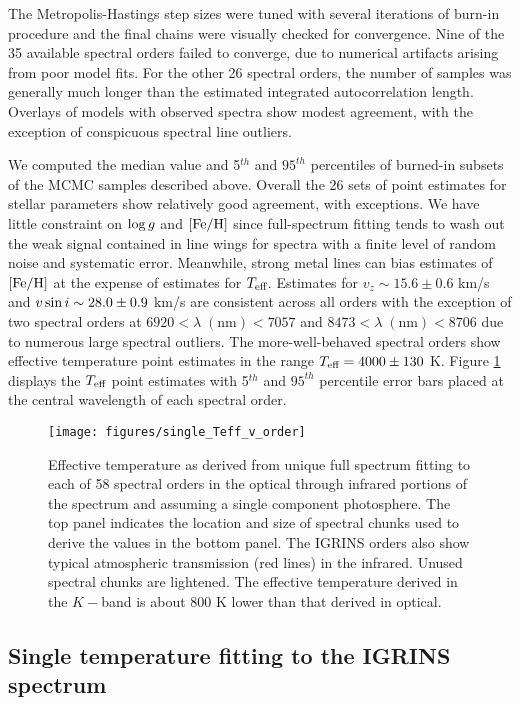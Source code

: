\documentclass[twocolumn]{emulateapj}%
\begin{document}
The Metropolis-Hastings step sizes were tuned with several iterations of burn-in procedure and the final chains were visually checked for convergence.  Nine of the 35 available spectral orders failed to converge, due to numerical artifacts arising from poor model fits.  For the other 26 spectral orders, the number of samples was generally much longer than the estimated integrated autocorrelation length.  Overlays of models with observed spectra show modest agreement, with the exception of conspicuous spectral line outliers.

We computed the median value and 5$^{th}$ and $95^{th}$ percentiles of burned-in subsets of the MCMC samples described above.  Overall the 26 sets of point estimates for stellar parameters show relatively good agreement, with exceptions.  We have little constraint on $\log g$ and $[{\rm Fe}/{\rm H}]$ since full-spectrum fitting tends to wash out the weak signal contained in line wings for spectra with a finite level of random noise and systematic error.  Meanwhile, strong metal lines can bias estimates of $[{\rm Fe}/{\rm H}]$ at the expense of estimates for $T_\textrm{eff}$.  Estimates for $v_z \sim 15.6 \pm 0.6$ km/s and $v \sin i \sim 28.0 \pm 0.9$ km/s are consistent across all orders with the exception of two spectral orders at $6920 <\lambda \;(\mathrm{nm})< 7057$ and $8473 < \lambda \;(\mathrm{nm}) < 8706$ due to numerous large spectral outliers.  The more-well-behaved spectral orders show effective temperature point estimates in the range $T_\textrm{eff}=4000\pm130$ K.  Figure \ref{fig:SingleTeffvsOrder} displays the $T_\textrm{eff}$ point estimates with 5$^{th}$ and $95^{th}$ percentile error bars placed at the central wavelength of each spectral order.

\begin{figure}
 \centering
 \texttt{[image: figures/single\_Teff\_v\_order]}
 \caption{Effective temperature as derived from unique full spectrum fitting to each of 58 spectral orders in the optical through infrared portions of the spectrum and assuming a single component photosphere.  The top panel indicates the location and size of spectral chunks used to derive the values in the bottom panel.  The IGRINS orders also show typical atmospheric transmission (red lines) in the infrared.  Unused spectral chunks are lightened.  The effective temperature derived in the $K-$band is about 800 K lower than that derived in optical.}
 \label{fig:SingleTeffvsOrder}
\end{figure}

\subsection{Single temperature fitting to the IGRINS spectrum}\label{sec:IGR_starfish}
\end{document}
